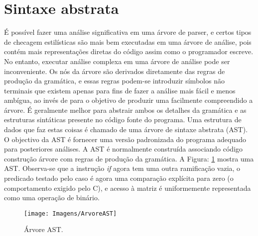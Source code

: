 	\section{Sintaxe abstrata}
	É possível fazer uma análise significativa em uma árvore de parser, e certos tipos de checagem estilísticas são mais bem executadas em uma árvore de análise, pois contém mais representações diretas do código assim como o programador escreve. No entanto, executar análise complexa em uma árvore de análise pode ser inconveniente. Os nós da árvore são derivados diretamente das regras de produção da gramática, e essas regras podem-se introduzir símbolos não terminais que existem apenas para fins de fazer a análise mais fácil e menos ambígua, ao invés de para o objetivo de produzir uma facilmente compreendido a árvore. É geralmente melhor para abstrair ambos os detalhes da gramática e as estruturas sintáticas presente no código fonte do programa. Uma estrutura de dados que faz estas coisas é chamado de uma árvore de sintaxe abstrata (AST). O objectivo da AST é fornecer uma versão padronizada do programa adequado para posteriores análises. A AST é normalmente construída associando código construção árvore com regras de produção da gramática. A Figura: \ref{fig:ArvoreAST} mostra uma AST. Observa-se que a instrução {\it if} agora tem uma outra ramificação vazia, o predicado testado pelo caso é agora uma comparação explícita para zero (o comportamento exigido pelo C), e acesso à matriz é uniformemente representada como uma operação de binário.
	
	\begin{figure}[h]
		\center
		\texttt{[image: Imagens/ArvoreAST]}
		\label{fig:ArvoreAST}
		\caption{Árvore AST.}
	\end{figure}

